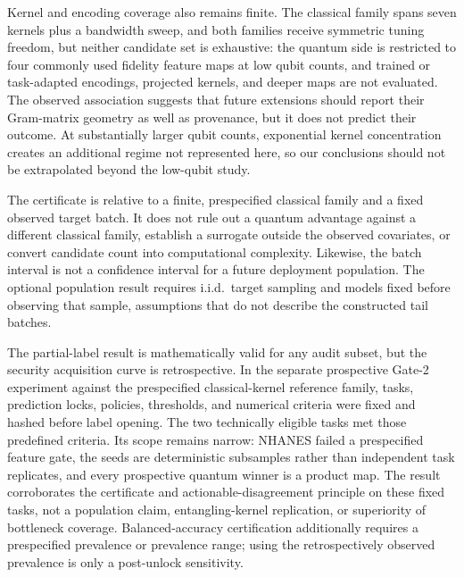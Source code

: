 \documentclass[referee,lineno,pdflatex,sn-nature]{sn-jnl}
\theoremstyle{thmstyleone}%
\theoremstyle{thmstyletwo}%
\theoremstyle{thmstylethree}%
\begin{document}
Kernel and encoding coverage also remains finite. The classical family spans seven kernels plus a bandwidth sweep, and both families receive symmetric tuning freedom, but neither candidate set is exhaustive: the quantum side is restricted to four commonly used fidelity feature maps at low qubit counts, and trained or task-adapted encodings, projected kernels, and deeper maps are not evaluated. The observed association suggests that future extensions should report their Gram-matrix geometry as well as provenance, but it does not predict their outcome. At substantially larger qubit counts, exponential kernel concentration \cite{thanasilp2024concentration} creates an additional regime not represented here, so our conclusions should not be extrapolated beyond the low-qubit study.

The certificate is relative to a finite, prespecified classical family and a fixed observed target batch. It does not rule out a quantum advantage against a different classical family, establish a surrogate outside the observed covariates, or convert candidate count into computational complexity. Likewise, the batch interval is not a confidence interval for a future deployment population. The optional population result requires i.i.d.\ target sampling and models fixed before observing that sample, assumptions that do not describe the constructed tail batches.

The partial-label result is mathematically valid for any audit subset, but the security acquisition curve is retrospective. In the separate prospective Gate-2 experiment against the prespecified classical-kernel reference family, tasks, prediction locks, policies, thresholds, and numerical criteria were fixed and hashed before label opening. The two technically eligible tasks met those predefined criteria. Its scope remains narrow: NHANES failed a prespecified feature gate, the seeds are deterministic subsamples rather than independent task replicates, and every prospective quantum winner is a product map. The result corroborates the certificate and actionable-disagreement principle on these fixed tasks, not a population claim, entangling-kernel replication, or superiority of bottleneck coverage. Balanced-accuracy certification additionally requires a prespecified prevalence or prevalence range; using the retrospectively observed prevalence is only a post-unlock sensitivity.
\end{document}
